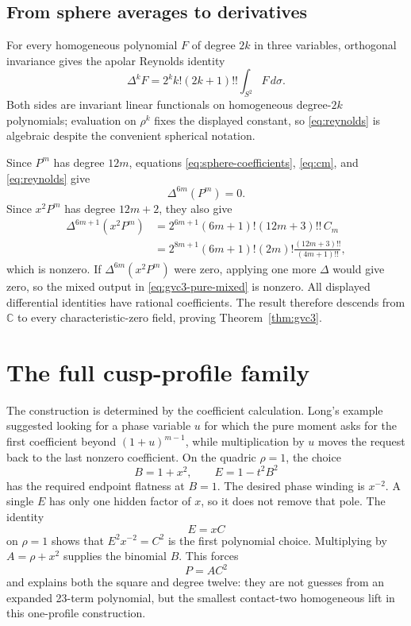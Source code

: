 \documentclass[11pt]{article}
\begin{document}
\subsection{From sphere averages to derivatives}

For every homogeneous polynomial $F$ of degree $2k$ in three variables,
orthogonal invariance gives the apolar Reynolds identity
\begin{equation}\label{eq:reynolds}
 \Delta^kF
 =2^kk!(2k+1)!!\int_{S^2}F\,d\sigma.
\end{equation}
Both sides are invariant linear functionals on homogeneous degree-$2k$
polynomials; evaluation on $\rho^k$ fixes the displayed constant, so
\eqref{eq:reynolds} is algebraic despite the convenient spherical notation.

Since $P^m$ has degree $12m$, equations
\eqref{eq:sphere-coefficients}, \eqref{eq:cm}, and
\eqref{eq:reynolds} give
\[
 \Delta^{6m}(P^m)=0.
\]
Since $x^2P^m$ has degree $12m+2$, they also give
\begin{align*}
 \Delta^{6m+1}(x^2P^m)
 &=2^{6m+1}(6m+1)!(12m+3)!!\,C_m\\
 &=2^{8m+1}(6m+1)!(2m)!
   \frac{(12m+3)!!}{(4m+1)!!},
\end{align*}
which is nonzero.  If $\Delta^{6m}(x^2P^m)$ were zero, applying one more
$\Delta$ would give zero, so the mixed output in
\eqref{eq:gvc3-pure-mixed} is nonzero.  All displayed differential
identities have rational coefficients.  The result therefore descends from
$\mathbb C$ to every characteristic-zero field, proving
Theorem~\ref{thm:gvc3}.

\section{The full cusp-profile family}

The construction is determined by the coefficient calculation.
Long's example suggested looking for a phase variable $u$ for which the
pure moment asks for the first coefficient beyond
$(1+u)^{m-1}$, while multiplication by $u$ moves the request back to the
last nonzero coefficient.  On the quadric $\rho=1$, the choice
\[
 B=1+x^2,
 \qquad E=1-t^2B^2
\]
has the required endpoint flatness at $B=1$.  The desired phase winding is
$x^{-2}$.  A single $E$ has only one hidden factor of $x$, so it does not
remove that pole.  The identity
\[
 E=xC
\]
on $\rho=1$ shows that $E^2x^{-2}=C^2$ is the first polynomial choice.
Multiplying by $A=\rho+x^2$ supplies the binomial $B$.  This forces
\[
 P=AC^2
\]
and explains both the square and degree twelve: they are not guesses from
an expanded 23-term polynomial, but the smallest contact-two homogeneous
lift in this one-profile construction.
\end{document}
